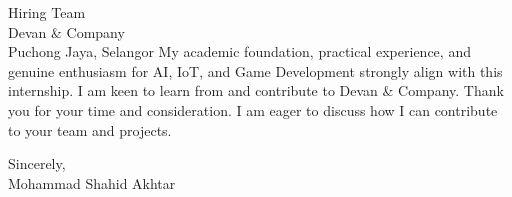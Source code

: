 \documentclass[10.5pt]{letter}
\begin{document}
\begin{letter}{Hiring Team\\Devan \& Company\\Puchong Jaya, Selangor}
\vspace{0.5cm}
My academic foundation, practical experience, and genuine enthusiasm for AI, IoT, and Game Development strongly align with this internship. I am keen to learn from and contribute to Devan \& Company. Thank you for your time and consideration. I am eager to discuss how I can contribute to your team and projects.

\vspace{0.5cm}

\begin{flushleft}
\vspace{0.3cm}
Sincerely,\\[2ex]
Mohammad Shahid Akhtar
\end{flushleft}

\end{letter}
\end{document}
